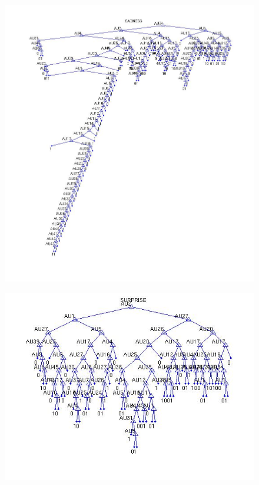 \documentclass[11pt]{amsart}
\begin{document}
\begin{figure}[h]
\includegraphics[width=\linewidth]{sadness.jpg}
\end{figure}

\begin{figure}[h]
\includegraphics[width=\linewidth]{surprise.jpg}
\end{figure}
\end{document}
